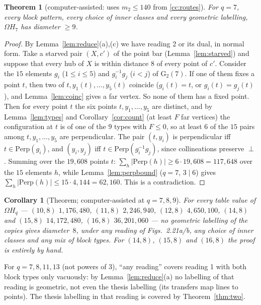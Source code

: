 \documentclass[11pt]{amsart}
\theoremstyle{plain}
\newtheorem{theorem}{Theorem}
\newtheorem{corollary}[lemma]{Corollary}
\theoremstyle{definition}
\theoremstyle{remark}
\newcommand{\Perp}{\mathrm{Perp}}
\newcommand{\GG}{\mathrm{G}_2}
\newcommand{\Om}{\Omega}
\newcommand{\ip}{\perp}
\begin{document}
\begin{theorem}[computer-assisted: uses $m_2 \le 140$ from \ref{cc:routes}]\label{thm:geo7}
For $q = 7$, every block pattern, every choice of inner classes and every geometric labelling, $\Om H_7$ has
diameter $\ge 9$.
\end{theorem}

\begin{proof}
By Lemma~\ref{lem:reduce}(a),(c) we have reading 2 or its dual, in normal form. Take a starved pair $(X, c')$ of the point
bar (Lemma~\ref{lem:starved}) and suppose that every hub of $X$ is within distance $8$ of every point of $c'$. Consider
the $15$ elements $g_i$ ($1 \le i \le 5$) and $g_i^{-1}g_j$ ($i < j$) of $\GG(7)$. If one of them fixes a point $t$, then
two of $t, y_1(t), \dots, y_5(t)$ coincide ($g_i(t) = t$, or $g_i(t) = g_j(t)$), and Lemma~\ref{lem:coinc} gives a far
vertex. So none of them has a fixed point. Then for every point $t$ the six points $t, y_1, \dots, y_5$ are distinct,
and by Lemma~\ref{lem:types} and Corollary~\ref{cor:count} (at least $F$ far vertices) the configuration at $t$ is of one
of the $9$ types with $F \le 0$, so at least $6$ of the $15$ pairs among $t, y_1, \dots, y_5$ are perpendicular. The pair
$(t, y_i)$ is perpendicular iff $t \in \Perp(g_i)$, and $(y_i, y_j)$ iff $t \in \Perp(g_i^{-1}g_j)$, since
collineations preserve $\ip$. Summing over the $19{,}608$ points $t$: $\sum_h |\Perp(h)| \ge 6 \cdot 19{,}608 =
117{,}648$ over the $15$ elements $h$, while Lemma~\ref{lem:perpbound} ($q = 7$, $3 \mid 6$) gives
$\sum_h |\Perp(h)| \le 15 \cdot 4{,}144 = 62{,}160$. This is a contradiction.
\end{proof}

\begin{corollary}[Theorem; computer-assisted at $q = 7, 8, 9$]\label{cor:geo}
For every table value of $\Om H_q$ --- $(10,8)$ $1{,}176{,}480$, $(11,8)$ $2{,}246{,}940$, $(12,8)$ $4{,}650{,}100$,
$(14,8)$ and $(15,8)$ $14{,}172{,}480$, $(16,8)$ $36{,}201{,}060$ --- no geometric labelling of the copies gives
diameter~$8$, under any reading of Figs.~2.21a/b, any choice of inner classes and any mix of block types. For $(14,8)$,
$(15,8)$ and $(16,8)$ the proof is entirely by hand.
\end{corollary}

For $q = 7, 8, 11, 13$ (not powers of $3$), ``any reading'' covers reading 1 with both block types only vacuously: by
Lemma~\ref{lem:reduce}(a) no labelling of that reading is geometric, not even the thesis labelling (its transfers map lines
to points). The thesis labelling in that reading is covered by Theorem~\ref{thm:two}.
\end{document}
